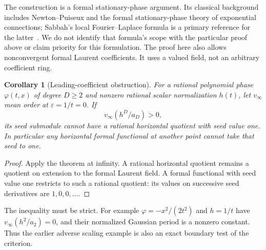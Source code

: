 \documentclass[11pt]{article}
\newtheorem{corollary}[theorem]{Corollary}
\theoremstyle{definition}\newtheorem{definition}[theorem]{Definition}
\theoremstyle{remark}\newtheorem{remark}[theorem]{Remark}
\begin{document}
The construction is a formal stationary-phase argument. Its classical
background includes Newton--Puiseux and the formal stationary-phase
theory of exponential connections; Sabbah's local Fourier--Laplace
formula is a primary reference for the latter~\cite{SabbahStationary}.
We do not identify that formula's scope with the particular proof
above or claim priority for this formulation. The proof here also
allows nonconvergent formal Laurent coefficients. It uses a valued
field, not an arbitrary coefficient ring.

\begin{corollary}[Leading-coefficient obstruction]\label{cor:leadingobstruction}
For a rational polynomial phase $\varphi(t,x)$ of degree $D\geq2$
and nonzero rational scalar normalization $h(t)$, let $v_\infty$
mean order at $\varepsilon=1/t=0$. If
\begin{equation}\label{eq:leadingcriterion}
 v_\infty(h^D/a_D)>0,
\end{equation}
its seed submodule cannot have a rational horizontal quotient with
seed value one. In particular any horizontal formal functional at
another point cannot take that seed to one.
\end{corollary}
\begin{proof}
Apply the theorem at infinity. A rational horizontal quotient remains
a quotient on extension to the formal Laurent field. A formal
functional with seed value one restricts to such a rational quotient:
its values on successive seed derivatives are $1,0,0,\ldots$.
\end{proof}

The inequality must be strict. For example
$\varphi=-x^2/(2t^2)$ and $h=1/t$ have
$v_\infty(h^2/a_2)=0$, and their normalized Gaussian period is a
nonzero constant. Thus the earlier adverse scaling example is also
an exact boundary test of the criterion.
\end{document}
